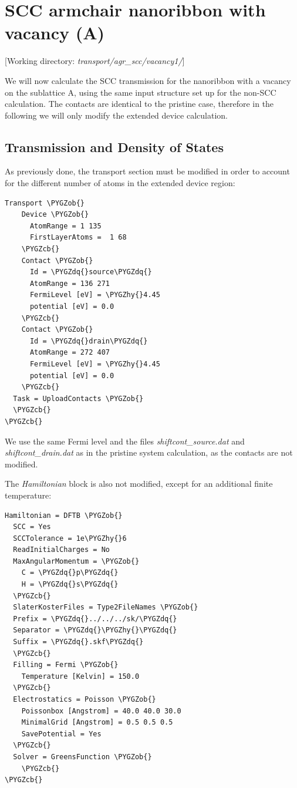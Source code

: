 \documentclass[a4paper,11pt,english]{sphinxmanual}
\def\PYGZob{\char`\{}
\def\PYGZcb{\char`\}}
\def\PYGZhy{\char`\-}
\def\PYGZdq{\char`\"}
\begin{document}
{{\section{SCC armchair nanoribbon with vacancy (A)}
\label{transport:scc-armchair-nanoribbon-with-vacancy-a}
{[}Working directory: \emph{transport/agr\_scc/vacancy1/}{]}

We will now calculate the SCC transmission for the nanoribbon with a
vacancy on the sublattice A, using the same input structure set up for
the non-SCC calculation. The contacts are identical to the pristine
case, therefore in the following we will only modify the extended
device calculation.


\subsection{Transmission and Density of States}
\label{transport:id4}
As previously done, the transport section must be modified in order to
account for the different number of atoms in the extended device
region:

\begin{Verbatim}[commandchars=\\\{\}]
Transport \PYGZob{}
    Device \PYGZob{}
      AtomRange = 1 135
      FirstLayerAtoms =  1 68
    \PYGZcb{}
    Contact \PYGZob{}
      Id = \PYGZdq{}source\PYGZdq{}
      AtomRange = 136 271
      FermiLevel [eV] = \PYGZhy{}4.45
      potential [eV] = 0.0
    \PYGZcb{}
    Contact \PYGZob{}
      Id = \PYGZdq{}drain\PYGZdq{}
      AtomRange = 272 407
      FermiLevel [eV] = \PYGZhy{}4.45
      potential [eV] = 0.0
    \PYGZcb{}
  Task = UploadContacts \PYGZob{}
  \PYGZcb{}
\PYGZcb{}
\end{Verbatim}

We use the same Fermi level and the files \emph{shiftcont\_source.dat} and
\emph{shiftcont\_drain.dat} as in the pristine system calculation, as the
contacts are not modified.

The \emph{Hamiltonian} block is also not modified, except for an additional
finite temperature:

\begin{Verbatim}[commandchars=\\\{\}]
Hamiltonian = DFTB \PYGZob{}
  SCC = Yes
  SCCTolerance = 1e\PYGZhy{}6
  ReadInitialCharges = No
  MaxAngularMomentum = \PYGZob{}
    C = \PYGZdq{}p\PYGZdq{}
    H = \PYGZdq{}s\PYGZdq{}
  \PYGZcb{}
  SlaterKosterFiles = Type2FileNames \PYGZob{}
  Prefix = \PYGZdq{}../../../sk/\PYGZdq{}
  Separator = \PYGZdq{}\PYGZhy{}\PYGZdq{}
  Suffix = \PYGZdq{}.skf\PYGZdq{}
  \PYGZcb{}
  Filling = Fermi \PYGZob{}
    Temperature [Kelvin] = 150.0
  \PYGZcb{}
  Electrostatics = Poisson \PYGZob{}
    Poissonbox [Angstrom] = 40.0 40.0 30.0
    MinimalGrid [Angstrom] = 0.5 0.5 0.5
    SavePotential = Yes
  \PYGZcb{}
  Solver = GreensFunction \PYGZob{}
    \PYGZcb{}
\PYGZcb{}
\end{Verbatim}

}}
\end{document}

